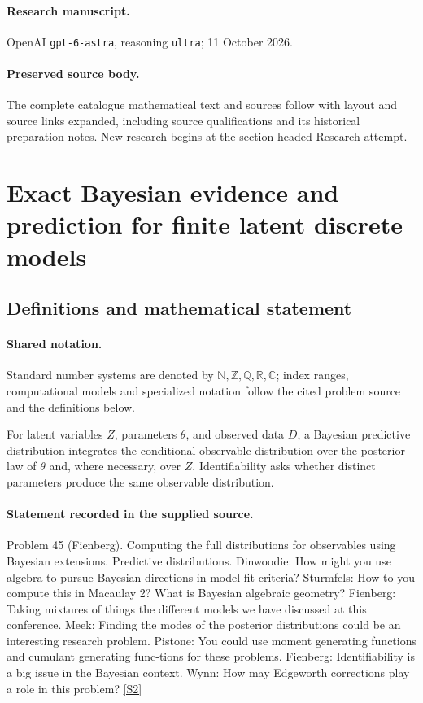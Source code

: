 \documentclass[11pt]{article}
\begin{document}
\paragraph{Research manuscript.} OpenAI \texttt{gpt-6-astra}, reasoning \texttt{ultra}; 11 October 2026.
\paragraph{Preserved source body.} The complete catalogue mathematical text and sources follow with layout and source links expanded, including source qualifications and its historical preparation notes. New research begins at the section headed Research attempt.

\section{Exact Bayesian evidence and prediction for finite latent discrete models}\label{statement}

\subsection{Definitions and mathematical statement}

\paragraph{Shared notation.}Standard number systems are denoted by $\mathbb N,\mathbb Z,\mathbb Q,\mathbb R,\mathbb C$; index ranges, computational models and specialized notation follow the cited problem source and the definitions below.


For latent variables $Z$, parameters $\theta$, and observed data $D$, a Bayesian predictive distribution integrates the conditional observable distribution over the posterior law of $\theta$ and, where necessary, over $Z$. Identifiability asks whether distinct parameters produce the same observable distribution.
\paragraph{Statement recorded in the supplied source.}
Problem 45 (Fienberg). Computing the full distributions for observables using Bayesian extensions. Predictive distributions. Dinwoodie: How might you use algebra to pursue Bayesian directions in model fit criteria? Sturmfels: How to you compute this in Macaulay 2? What is Bayesian algebraic geometry? Fienberg: Taking mixtures of things the different models we have discussed at this conference. Meek: Finding the modes of the posterior distributions could be an interesting research problem. Pistone: You could use moment generating functions and cumulant generating func-tions for these problems. Fienberg: Identifiability is a big issue in the Bayesian context. Wynn: How may Edgeworth corrections play a role in this problem? \href{https://aimath.org/WWN/compalgstat/compalgstat.pdf}{[S2]}
\end{document}
